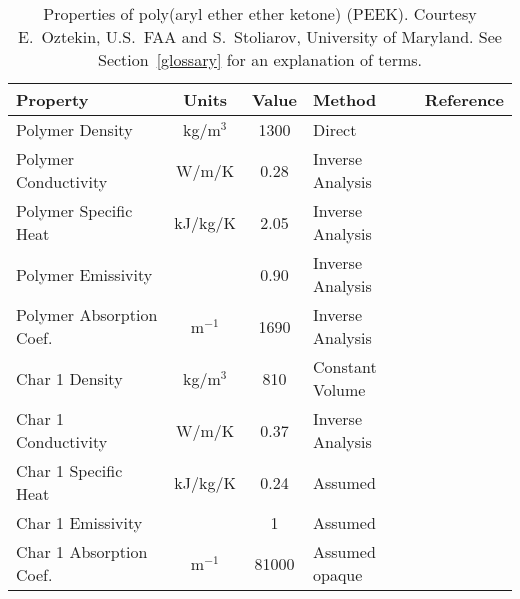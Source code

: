 \begin{table}[p]
\caption[Properties of poly(aryl ether ether ketone) (PEEK)]{Properties of poly(aryl ether ether ketone) (PEEK). Courtesy E.~Oztekin, U.S.~FAA and S.~Stoliarov,
University of Maryland. See Section~\ref{glossary} for an explanation of terms.}
\begin{center}
\begin{tabular}{|l|c|c|l|l|}
\hline
Property                    & Units         & Value                             & Method                    &  Reference                              \\ \hline \hline
Polymer Density             & kg/m$^3$      & 1300                              & Direct                    &  \cite{Oztekin:CF2012}                  \\ \hline
Polymer Conductivity        & W/m/K         & 0.28                              & Inverse Analysis          &  \cite{Oztekin:CF2012}                  \\ \hline
Polymer Specific Heat       & kJ/kg/K       & 2.05                              & Inverse Analysis          &  \cite{Oztekin:CF2012}                  \\ \hline
Polymer Emissivity          &               & 0.90                              & Inverse Analysis          &  \cite{Oztekin:CF2012}                  \\ \hline
Polymer Absorption Coef.    & m$^{-1}$      & 1690                              & Inverse Analysis          &  \cite{Oztekin:CF2012}                  \\ \hline
Char 1 Density              & kg/m$^3$      & 810                               & Constant Volume           &  \cite{Oztekin:CF2012}                  \\ \hline
Char 1 Conductivity         & W/m/K         & 0.37                              & Inverse Analysis          &  \cite{Oztekin:CF2012}                  \\ \hline
Char 1 Specific Heat        & kJ/kg/K       & 0.24                              & Assumed                   &  \cite{Oztekin:CF2012}                  \\ \hline
Char 1 Emissivity           &               & 1                                 & Assumed                   &  \cite{Oztekin:CF2012}                  \\ \hline
Char 1 Absorption Coef.     & m$^{-1}$      & 81000                             & Assumed opaque            &  \cite{Oztekin:CF2012}                  \\ \hline

\end{tabular}
\end{center}
\end{table}
